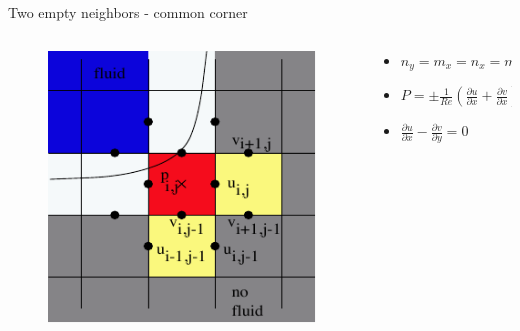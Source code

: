 \documentclass{beamer}
\begin{document}
	\begin{frame}{Two empty neighbors - common corner}
	    \begin{columns}
	 		\begin{column}[c]{0.4\textwidth}
		 		\begin{figure}
					\includegraphics[width=1\textwidth]{pic/two1.pdf}
		 		\end{figure}
			\end{column}
			\begin{column}[c]{0.6\textwidth}
				\begin{itemize}
					\item $ n_y = m_x=n_x = m_y  $
					\item $ P=\pm \frac{1}{Re}\left( \frac{\partial u}{\partial x}+  \frac{\partial v}{\partial x} \right) $
					\item $ \frac{\partial u}{\partial x}- \frac{\partial v}{\partial y}=0 $
				\end{itemize}
			\end{column}
		\end{columns}		
	\end{frame}	
	
\end{document}
